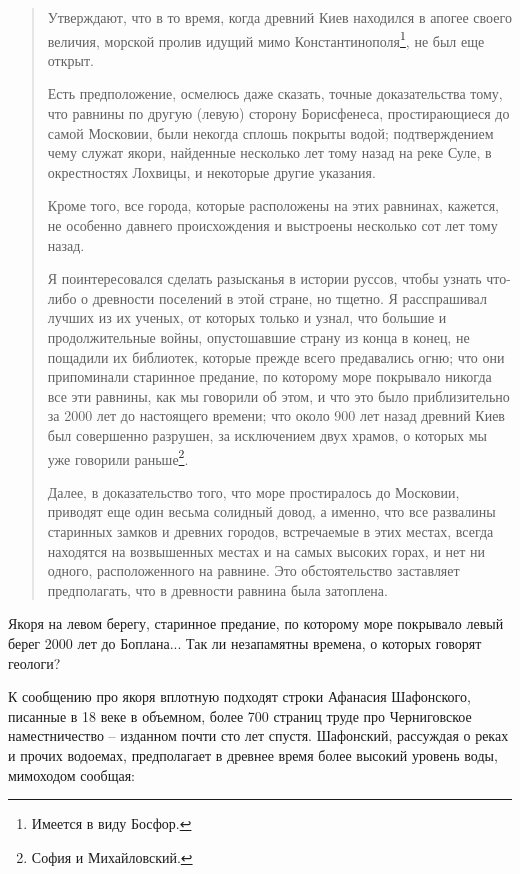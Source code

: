 \begin{quotation}
Утверждают, что в то время, когда древний Киев находился в апогее своего величия, морской пролив идущий мимо Константинополя\footnote{Имеется в виду Босфор.}, не был еще открыт. 

Есть предположение, осмелюсь даже сказать, точные доказательства тому, что равнины по другую (левую) сторону Борисфенеса, простирающиеся до самой Московии, были некогда сплошь покрыты водой; подтверждением чему служат якори, найденные несколько лет тому назад на реке Суле, в окрестностях Лохвицы, и некоторые другие указания. 

Кроме того, все города, которые расположены на этих равнинах, кажется, не особенно давнего происхождения и выстроены несколько сот лет тому назад.

Я поинтересовался сделать разысканья в истории руссов, чтобы узнать что-либо о древности поселений в этой стране, но тщетно. Я расспрашивал лучших из их ученых, от которых только и узнал, что большие и продолжительные войны, опустошавшие страну из конца в конец, не пощадили их библиотек, которые прежде всего предавались огню; что они припоминали старинное предание, по которому море покрывало никогда все эти равнины, как мы говорили об этом, и что это было приблизительно за 2000 лет до настоящего времени; что около 900 лет назад древний Киев был совершенно разрушен, за исключением двух храмов, о которых мы уже говорили раньше\footnote{София и Михайловский.}. 

Далее, в доказательство того, что море простиралось до Московии, приводят еще один весьма солидный довод, а именно, что все развалины старинных замков и древних городов, встречаемые в этих местах, всегда находятся на возвышенных местах и на самых высоких горах, и нет ни одного, расположенного на равнине. Это обстоятельство заставляет предполагать, что в древности равнина была затоплена.
\end{quotation}

Якоря на левом берегу, старинное предание, по которому море покрывало левый берег 2000 лет до Боплана... Так ли незапамятны времена, о которых говорят геологи?

К сообщению про якоря вплотную подходят строки Афанасия Шафонского, писанные в 18 веке в объемном, более 700 страниц труде про Черниговское наместничес\-тво\cite[стр. 6]{ochernignamest} – изданном почти сто лет спустя. Шафонский, рассуждая о реках и прочих водоемах, предполагает в древнее время более высокий уровень воды, мимоходом сообщая:

